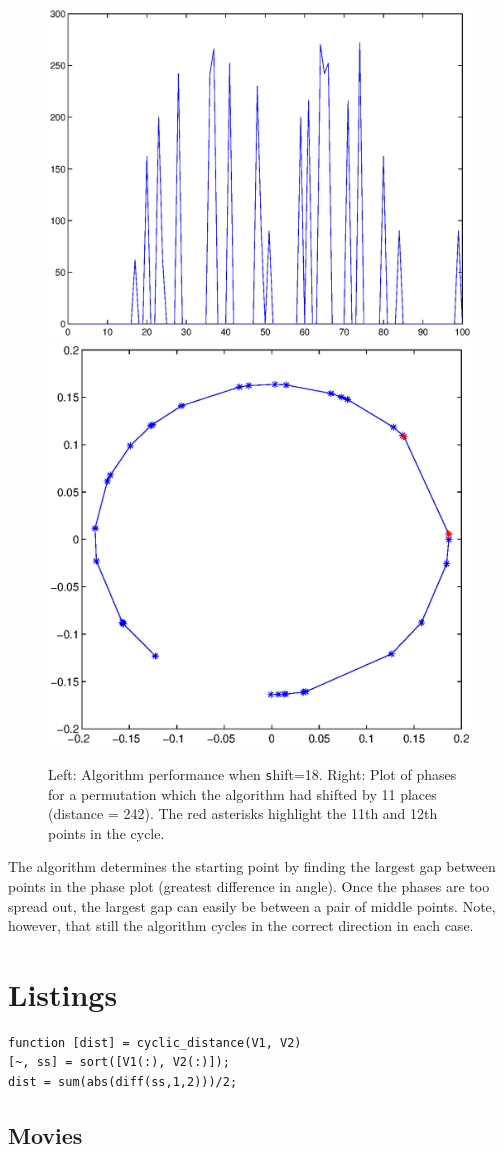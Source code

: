 \documentclass[11pt]{article}
\begin{document}
\begin{figure}[H]
\includegraphics[width=.45\textwidth]{pictures/1_24_16/sine_cpsn_shift18.eps}
\includegraphics[width=.45\textwidth]{pictures/1_24_16/phases_shift18.eps}
\caption{Left: Algorithm performance when \texttt shift=18. Right: Plot of phases for a permutation which the algorithm had shifted by 11 places (distance = 242). The red asterisks highlight the 11th and 12th points in the cycle.}  
\end{figure}
The algorithm determines the starting point by finding the largest gap between points in the phase plot (greatest difference in angle). Once the phases are too spread out, the largest gap can easily be between a pair of middle points. Note, however, that still the algorithm cycles in the correct direction in each case. 


\section{Listings}
\lstset{language=Matlab, caption=cyclic\_distance}
\begin{lstlisting}[frame=single]
function [dist] = cyclic_distance(V1, V2)
[~, ss] = sort([V1(:), V2(:)]);
dist = sum(abs(diff(ss,1,2)))/2;
\end{lstlisting}

\subsection{Movies}
\end{document}
